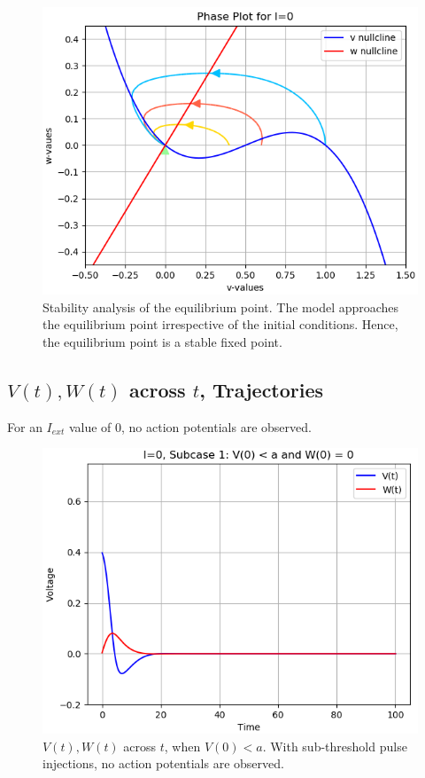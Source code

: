\documentclass[12pt,a4paper]{article}
\begin{document}
	\begin{figure}[H]
	\centering
	\includegraphics[scale=0.6]{images/Figure_2.png}
	\caption{Stability analysis of the equilibrium point. The model approaches the equilibrium point irrespective of the initial conditions. Hence, the equilibrium point is a stable fixed point.}
	\end{figure}

\subsection{$V(t), W(t)$ across $t$, Trajectories}
	For an $I_{ext}$ value of 0, no action potentials are observed.	
	\begin{figure}[H]
	\centering
	\includegraphics[scale=0.6]{images/Figure_3.png}
	\caption{$V(t), W(t)$ across $t$, when $V(0)<a$. With sub-threshold pulse injections, no action potentials are observed.}
	\end{figure}
\end{document}
